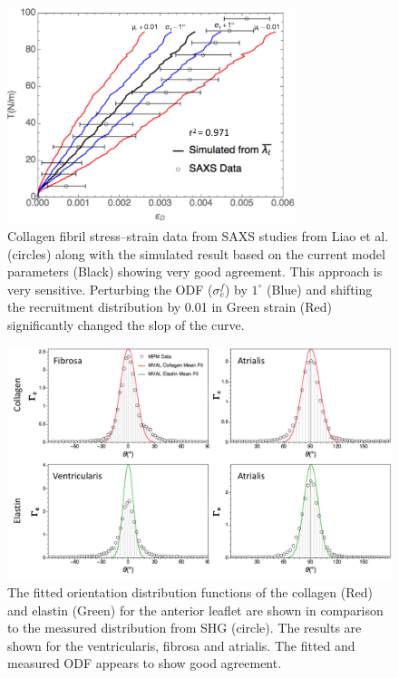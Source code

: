     
\begin{figure}
\centering
\includegraphics[width=0.75\textwidth]{Images/chapter2/figure7.pdf}
\caption{Collagen fibril stress–strain data from SAXS studies from Liao et al. \cite{liao_relation_2007} (circles) along with the simulated result based on the current model parameters (Black) showing very good agreement. This approach is very sensitive. Perturbing the ODF ($\sigma_c^f$) by $1^\circ$ (Blue) and shifting the recruitment distribution by 0.01 in Green strain (Red) significantly changed the slop of the curve.}
\label{c2:fig:7}
\end{figure}


\begin{figure}
\centering
\includegraphics[width=\textwidth]{Images/chapter2/figure8.pdf}
\caption{The fitted orientation distribution functions of the collagen (Red) and elastin (Green) for the anterior leaflet are shown in comparison to the measured distribution from SHG (circle). The results are shown for the ventricularis, fibrosa and atrialis. The fitted and measured ODF appears to show good agreement. }
\label{c2:fig:8}
\end{figure}




